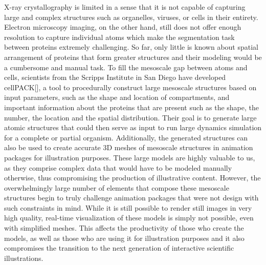 X-ray crystallography is limited in a sense that it is not capable of capturing large and complex structures such as organelles, viruses, or cells in their entirety.
Electron microscopy imaging, on the other hand, still does not offer enough resolution to capture individual atoms which make the segmentation task between proteins extremely challenging.
So far, only little is known about spatial arrangement of proteins that form greater structures and their modeling would be a cumbersome and manual task.
To fill the mesoscale gap between atoms and cells, scientists from the Scripps Institute in San Diego have developed cellPACK[], a tool to procedurally construct large mesoscale structures based on input parameters, such as the shape and location of compartments, and important information about the proteins that are present such as the shape, the number, the location and the spatial distribution.
Their goal is to generate large atomic structures that could then serve as input to run large dynamics simulation for a complete or partial organism.
Additionally, the generated structures can also be used to create accurate 3D meshes of mesoscale structures in animation packages for illustration purposes.
These large models are highly valuable to us, as they comprise complex data that would have to be modeled manually otherwise, thus compromising the production of illustrative content.
However, the overwhelmingly large number of elements that compose these mesoscale structures begin to truly challenge animation packages that were not design with such constraints in mind.
While it is still possible to render still images in very high quality, real-time visualization of these models is simply not possible, even with simplified meshes. 
This affects the productivity of those who create the models, as well as those who are using it for illustration purposes and it also compromises the transition to the next generation of interactive scientific illustrations.

